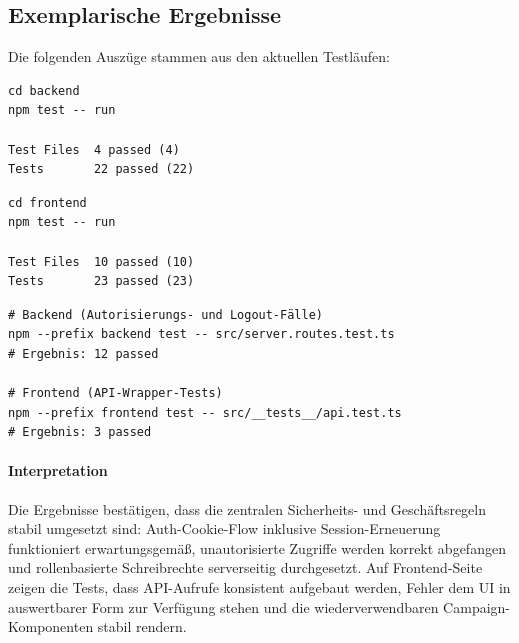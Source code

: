 \subsection{Exemplarische Ergebnisse}

Die folgenden Auszüge stammen aus den aktuellen Testläufen:

\begin{lstlisting}[style=terminal,caption={Backend-Testlauf}]
cd backend
npm test -- run

Test Files  4 passed (4)
Tests       22 passed (22)
\end{lstlisting}

\begin{lstlisting}[style=terminal,caption={Frontend-Testlauf}]
cd frontend
npm test -- run

Test Files  10 passed (10)
Tests       23 passed (23)
\end{lstlisting}

\begin{lstlisting}[style=terminal,caption={Ausgewählte gezielte Testläufe}]
# Backend (Autorisierungs- und Logout-Fälle)
npm --prefix backend test -- src/server.routes.test.ts
# Ergebnis: 12 passed

# Frontend (API-Wrapper-Tests)
npm --prefix frontend test -- src/__tests__/api.test.ts
# Ergebnis: 3 passed
\end{lstlisting}

\paragraph{Interpretation}
Die Ergebnisse bestätigen, dass die zentralen Sicherheits- und
Geschäftsregeln stabil umgesetzt sind:
Auth-Cookie-Flow inklusive Session-Erneuerung funktioniert erwartungsgemäß, unautorisierte Zugriffe werden
korrekt abgefangen und rollenbasierte Schreibrechte serverseitig durchgesetzt.
Auf Frontend-Seite zeigen die Tests, dass API-Aufrufe konsistent aufgebaut
werden, Fehler dem UI in auswertbarer Form zur Verfügung stehen und die
wiederverwendbaren Campaign-Komponenten stabil rendern.
